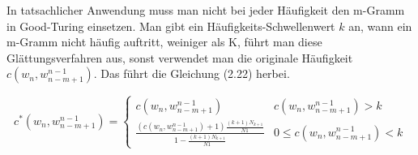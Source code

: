 In tatsachlicher Anwendung muss man nicht bei jeder H\"aufigkeit den m-Gramm in Good-Turing einsetzen. Man gibt ein H\"aufigkeits-Schwellenwert $k$ an, wann ein m-Gramm nicht h\"aufig auftritt, weiniger als K, f\"uhrt man diese Gl\"attungsverfahren aus, sonst verwendet man die originale H\"aufigkeit $c(w_{n},w_{n-m+1}^{n-1})$. Das f\"uhrt die Gleichung (2.22) herbei.

\begin{equation}
\label{equationo:witten_bell_04}
c^{*}(w_{n},w_{n-m+1}^{n-1})=\begin{cases}
c(w_{n},w_{n-m+1}^{n-1}) & c(w_{n},w_{n-m+1}^{n-1})>k \\
\frac{(c(w_{n},w_{n-m+1}^{n-1})+1)\frac{(k+1)N_{k+1}}{N{1}}}{1-\frac{(k+1)N_{k+1}}{N{1}}} & 0 \leq c(w_{n},w_{n-m+1}^{n-1})<k 
\end{cases}
\end{equation}